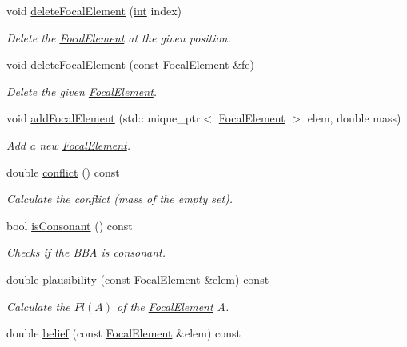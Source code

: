 \begin{DoxyCompactItemize}
void \hyperlink{classEvidence_a852aee625445547abfb4bb9a2031c10e}{delete\+Focal\+Element} (\hyperlink{CMakeCache_8txt_a79a3d8790b2588b09777910863574e09}{int} index)
\begin{DoxyCompactList}\small\item\em Delete the \hyperlink{classFocalElement}{Focal\+Element} at the given position. \end{DoxyCompactList}\item 
void \hyperlink{classEvidence_a1ebefa9999ec36cfd2fb782e6895e54c}{delete\+Focal\+Element} (const \hyperlink{classFocalElement}{Focal\+Element} \&fe)
\begin{DoxyCompactList}\small\item\em Delete the given \hyperlink{classFocalElement}{Focal\+Element}. \end{DoxyCompactList}\item 
void \hyperlink{classEvidence_a074be49ba8c3477d6d740a34ae2118b7}{add\+Focal\+Element} (std\+::unique\+\_\+ptr$<$ \hyperlink{classFocalElement}{Focal\+Element} $>$ elem, double mass)
\begin{DoxyCompactList}\small\item\em Add a new \hyperlink{classFocalElement}{Focal\+Element}. \end{DoxyCompactList}\item 
double \hyperlink{classEvidence_a65c3dd84b46113f721968869ee289edc}{conflict} () const 
\begin{DoxyCompactList}\small\item\em Calculate the conflict (mass of the empty set). \end{DoxyCompactList}\item 
bool \hyperlink{classEvidence_a4962e5c32a38d9c489ecb6afb6191c27}{is\+Consonant} () const 
\begin{DoxyCompactList}\small\item\em Checks if the B\+BA is consonant. \end{DoxyCompactList}\item 
double \hyperlink{classEvidence_ae50432e738f7aea56fe5802f1ec43cb7}{plausibility} (const \hyperlink{classFocalElement}{Focal\+Element} \&elem) const 
\begin{DoxyCompactList}\small\item\em Calculate the $Pl(A)$ of the \hyperlink{classFocalElement}{Focal\+Element} A. \end{DoxyCompactList}\item 
double \hyperlink{classEvidence_ac0b30688e56b6414e1a7733f58bec0dc}{belief} (const \hyperlink{classFocalElement}{Focal\+Element} \&elem) const 

\end{DoxyCompactItemize}

